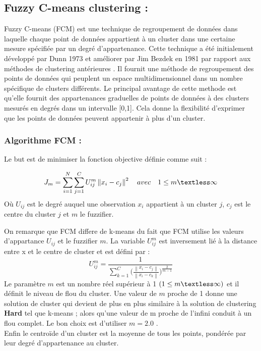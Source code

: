 \subsection{Fuzzy C-means clustering :}
Fuzzy C-means (FCM) est une technique de regroupement de données dans laquelle chaque point de données appartient à un cluster dans une certaine mesure spécifiée par un degré d'appartenance. Cette technique a été initialement développé par Dunn 1973 et améliorer par Jim Bezdek en 1981 par rapport aux méthodes de clustering antérieures \cite{taherpour2018application}. Il fournit une méthode de regroupement des points de données qui peuplent un espace multidimensionnel dans un nombre spécifique de clusters différents. Le principal avantage de cette methode est qu’elle fournit des appartenances graduelles de points de données à des clusters mesurés en degrés dans un intervalle [0,1]. Cela donne la flexibilité d'exprimer que les points de données peuvent appartenir à plus d'un cluster.
\subsubsection{Algorithme FCM :}
Le but est de minimiser la fonction objective définie comme suit :

\begin{equation}
    J_{m} = \sum_{i=1}^{N} \sum_{j=1}^{C} U_{ij}^{m} \left\lVert x_{i} - c_{j} \right\rVert^{2} \hspace{10pt} avec \hspace{10pt}  1 \leq m \textless \infty
\end{equation}
Où \(\displaystyle U_{ij} \) est le degré auquel une observation \(\displaystyle x_{i} \) appartient à un cluster \(\displaystyle j \), \(\displaystyle c_{j} \) est le centre du cluster \(\displaystyle j \) et \(\displaystyle m \) le fuzzifier.

On remarque que FCM differe de k-means  du fait que FCM utilise les valeurs d’appartance \(\displaystyle U_{ij} \) et le fuzzifier \(\displaystyle m \). La variable \(\displaystyle U_{ij}^{m} \) est inversement lié à la distance entre x et le centre de cluster et est défini par  :
\begin{equation}
    U_{ij}^{m} = \frac{1}{\sum_{k=1}^{C} \Bigg ( \frac{\left\lVert x_{i} - c_{j} \right\rVert }{\left\lVert x_{i} - c_{k} \right\rVert} \Bigg )^{\frac{2}{m-1}}}
\end{equation}
Le paramètre \(\displaystyle m \) est un nombre réel supérieur à 1 \(\displaystyle (1 \leq m \textless \infty) \) et il définit le niveau de flou du cluster. Une valeur de \(\displaystyle m \) proche de 1 donne une solution de cluster qui devient de plus en plus similaire à la solution de clustering \textbf{Hard} tel que k-means ; alors qu’une valeur de m proche de l’infini conduit à un flou complet. Le bon choix est d’utiliser \(\displaystyle m = 2.0 \) \cite{hathaway2001fuzzy}. \\
Enfin le centroïde d’un cluster est la moyenne de tous les points, pondérée par leur degré d’appartenance au cluster. 

